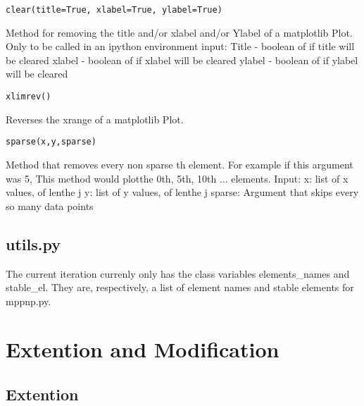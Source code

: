 		
\begin{verbatim}
clear(title=True, xlabel=True, ylabel=True)
\end{verbatim}
Method for removing the title and/or xlabel and/or Ylabel
		of a matplotlib Plot.  Only to be called in an ipython 
		environment\newline
		input:\newline
		Title -  boolean of if title will be cleared \newline
		xlabel - boolean of if xlabel will be cleared \newline
		ylabel - boolean of if ylabel will be cleared \newline\newline

\begin{verbatim}
xlimrev()
\end{verbatim}
Reverses the xrange of a matplotlib Plot.\newline\newline
\begin{verbatim}
sparse(x,y,sparse)
\end{verbatim}
Method that removes every non sparse th element.  For example 
if this argument was 5, This method would plotthe 0th, 5th, 10th ... elements.\newline
Input:\newline
x: list of x values, of lenthe j\newline
y: list of y values, of lenthe j\newline
sparse: Argument that skips every so many data points\newline\newline

\subsection{utils.py}
The current iteration currenly only has the class variables elements\_names and stable\_el.
They are, respectively, a list of element names and stable elements for mppnp.py.

\section{Extention and Modification}

\subsection{Extention}

